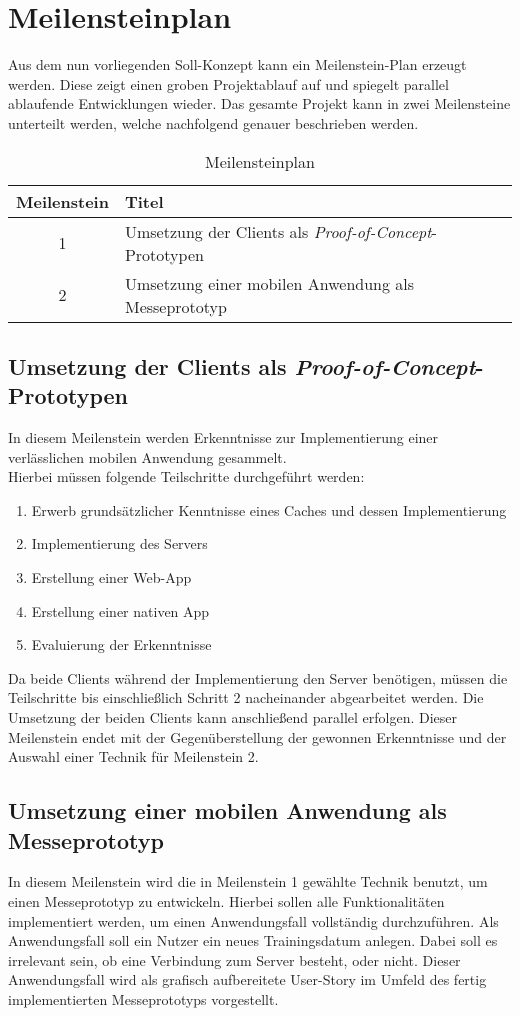 \section{Meilensteinplan}
\label{sec:meilenstein-plan}
Aus dem nun vorliegenden Soll-Konzept kann ein Meilenstein-Plan erzeugt werden. Diese zeigt einen groben Projektablauf auf und spiegelt parallel ablaufende Entwicklungen wieder. Das gesamte Projekt kann in zwei Meilensteine unterteilt werden, welche nachfolgend genauer beschrieben werden.
\begin{table}[!h]
\centering
\caption{Meilensteinplan}
\label{tbl:meilensteinplan}
\begin{tabular}{|c|l|}
\hline
{\bf Meilenstein} & {\bf Titel}                                                      \\ \hline
1                 & Umsetzung der Clients als \textit{Proof-of-Concept}-Prototypen \\ \hline
2                 & Umsetzung einer mobilen Anwendung als Messeprototyp              \\ \hline
\end{tabular}
\end{table}

\subsection{Umsetzung der Clients als \textit{Proof-of-Concept}-Prototypen}
In diesem Meilenstein werden Erkenntnisse zur Implementierung einer verlässlichen mobilen Anwendung gesammelt. \\
Hierbei müssen folgende Teilschritte durchgeführt werden:
\begin{enumerate}
\item Erwerb grundsätzlicher Kenntnisse eines Caches und dessen Implementierung
\item Implementierung des Servers 
\item Erstellung einer Web-App
\item Erstellung einer nativen App
\item Evaluierung der Erkenntnisse
\end{enumerate}
Da beide Clients während der Implementierung den Server benötigen, müssen die Teilschritte bis einschließlich Schritt 2 nacheinander abgearbeitet werden. Die Umsetzung der beiden Clients kann anschließend parallel erfolgen. Dieser Meilenstein endet mit der Gegenüberstellung der gewonnen Erkenntnisse und der Auswahl einer Technik für Meilenstein 2.
\subsection{Umsetzung einer mobilen Anwendung als Messeprototyp}
In diesem Meilenstein wird die in Meilenstein 1 gewählte Technik benutzt, um einen Messeprototyp zu entwickeln. Hierbei sollen alle Funktionalitäten implementiert werden, um einen Anwendungsfall vollständig durchzuführen. Als Anwendungsfall soll ein Nutzer ein neues Trainingsdatum anlegen. Dabei soll es irrelevant sein, ob eine Verbindung zum Server besteht, oder nicht. Dieser Anwendungsfall wird als grafisch aufbereitete User-Story im Umfeld des fertig implementierten Messeprototyps vorgestellt.